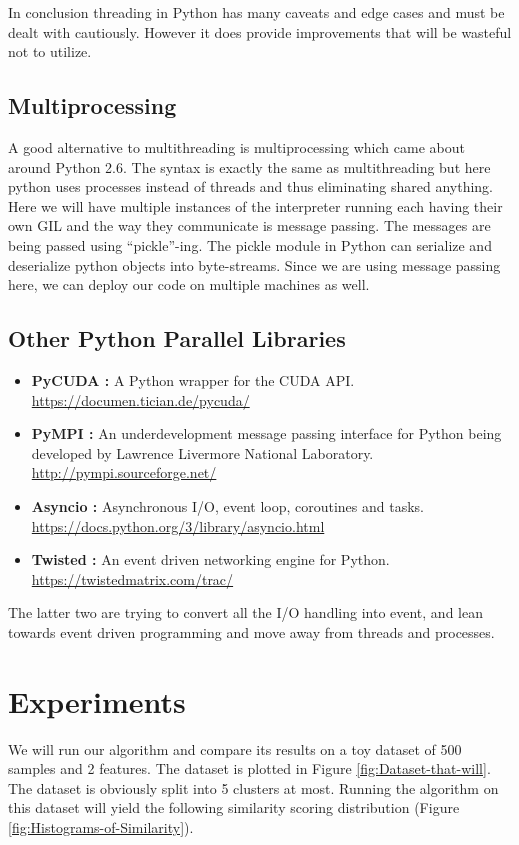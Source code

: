 \documentclass[10pt,twocolumn,letterpaper]{article}
\begin{document}
In conclusion threading in Python has many caveats and edge cases
and must be dealt with cautiously. However it does provide improvements
that will be wasteful not to utilize.


\subsection{Multiprocessing}

A good alternative to multithreading is multiprocessing which came
about around Python 2.6. The syntax is exactly the same as multithreading
but here python uses processes instead of threads and thus eliminating
shared anything. Here we will have multiple instances of the interpreter
running each having their own GIL and the way they communicate is
message passing. The messages are being passed using ``pickle''-ing.
The pickle module in Python can serialize and deserialize python objects
into byte-streams. Since we are using message passing here, we can
deploy our code on multiple machines as well. 

\subsection{Other Python Parallel Libraries}
\begin{itemize}
\item \textbf{PyCUDA : }A Python wrapper for the CUDA API. \url{https://documen.tician.de/pycuda/}
\item \textbf{PyMPI : }An underdevelopment message passing interface for
Python being developed by Lawrence Livermore National Laboratory.
\url{http://pympi.sourceforge.net/}
\item \textbf{Asyncio : }Asynchronous I/O, event loop, coroutines and tasks.
\url{https://docs.python.org/3/library/asyncio.html}
\item \textbf{Twisted : }An event driven networking engine for Python. \url{https://twistedmatrix.com/trac/}
\end{itemize}
The latter two are trying to convert all the I/O handling into event,
and lean towards event driven programming and move away from threads
and processes.

\section{Experiments} \label{implementation}

We will run our algorithm and compare its results on a toy dataset
of 500 samples and 2 features. The dataset is plotted in Figure \ref{fig:Dataset-that-will}. The dataset is obviously split into 5 clusters at most. Running the
algorithm on this dataset will yield the following similarity scoring
distribution (Figure \ref{fig:Histograms-of-Similarity}).
\end{document}
